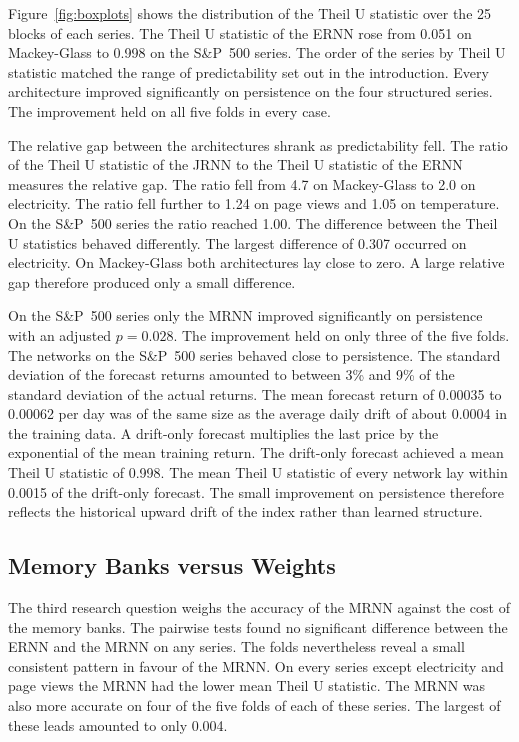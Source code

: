 \documentclass[conference,10pt]{IEEEtran}
\begin{document}
Figure~\ref{fig:boxplots} shows the distribution of the Theil U
statistic over the 25 blocks of each series.
The Theil U statistic of the ERNN rose from 0.051 on Mackey-Glass to
0.998 on the S\&P~500 series.
The order of the series by Theil U statistic matched the range of
predictability set out in the introduction.
Every architecture improved significantly on persistence on the four
structured series.
The improvement held on all five folds in every case.


The relative gap between the architectures shrank as predictability
fell.
The ratio of the Theil U statistic of the JRNN to the Theil U statistic
of the ERNN measures the relative gap.
The ratio fell from 4.7 on Mackey-Glass to 2.0 on electricity.
The ratio fell further to 1.24 on page views and 1.05 on temperature.
On the S\&P~500 series the ratio reached 1.00.
The difference between the Theil U statistics behaved differently.
The largest difference of 0.307 occurred on electricity.
On Mackey-Glass both architectures lay close to zero.
A large relative gap therefore produced only a small difference.

On the S\&P~500 series only the MRNN improved significantly on
persistence with an adjusted $p = 0.028$.
The improvement held on only three of the five folds.
The networks on the S\&P~500 series behaved close to persistence.
The standard deviation of the forecast returns amounted to between 3\%
and 9\% of the standard deviation of the actual returns.
The mean forecast return of 0.00035 to 0.00062 per day was of the same
size as the average daily drift of about 0.0004 in the training data.
A drift-only forecast multiplies the last price by the exponential of
the mean training return.
The drift-only forecast achieved a mean Theil U statistic of 0.998.
The mean Theil U statistic of every network lay within 0.0015 of the
drift-only forecast.
The small improvement on persistence therefore reflects the historical
upward drift of the index rather than learned structure.



\subsection{Memory Banks versus Weights}

The third research question weighs the accuracy of the MRNN against the
cost of the memory banks.
The pairwise tests found no significant difference between the ERNN and
the MRNN on any series.
The folds nevertheless reveal a small consistent pattern in favour of
the MRNN.
On every series except electricity and page views the MRNN had the
lower mean Theil U statistic.
The MRNN was also more accurate on four of the five folds of each of
these series.
The largest of these leads amounted to only 0.004.
\end{document}
